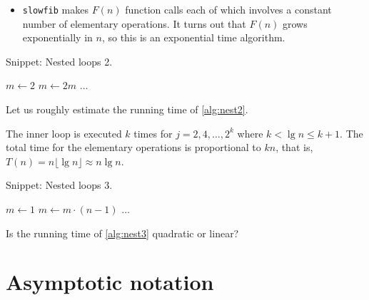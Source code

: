 \begin{frame}
\begin{itemize}[<+->]
\item \texttt{slowfib} makes $F(n)$ function calls each of which involves a
constant number of elementary operations. It turns out that $F(n)$ grows
exponentially in $n$, so this is an \alert{exponential time algorithm}.
\end{itemize}
\end{frame}
\fi


\begin{algorithm}[H]
  \caption{Snippet: Nested loops 2.}
  \label{alg:nest2}
\begin{algorithmic}[0]
\State $m \leftarrow 2$
		\State $m \leftarrow 2m$
			\State $\ldots$ 
		\EndFor
	\EndIf 
\EndFor
\end{algorithmic}
\end{algorithm}

\begin{Boxample}[6]
\label{exm:nest2}
Let us roughly estimate the running time of \cref{alg:nest2}.

The inner loop is executed $k$ times for $j=2, 4, \ldots, 2^{k}$
where $k < \lg n \le k+1$. The total time for the elementary operations is 
proportional to $kn$, that is, $T(n)=  n  \lfloor \lg n \rfloor \approx n\lg n$.
\end{Boxample}


\begin{algorithm}[H]
  \caption{Snippet: Nested loops 3.}
  \label{alg:nest3}
\begin{algorithmic}[0]
\State $m \leftarrow 1$
		\State $m \leftarrow m \cdot (n-1)$
			\State $\ldots$ 
		\EndFor
	\EndIf
\EndFor 
\end{algorithmic}
\end{algorithm}

\begin{Boxample}[6]
\label{exm:nest1}
Is the running time of \cref{alg:nest3} quadratic or linear?
\end{Boxample}



\chapter{Asymptotic notation} %

